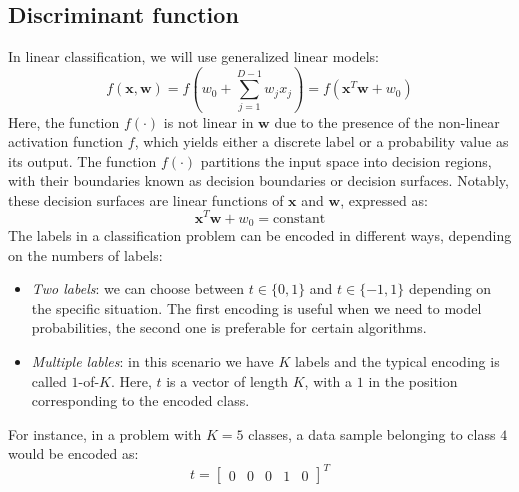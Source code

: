 \subsection{Discriminant function}
In linear classification, we will use generalized linear models: 
\[f(\textbf{x},\textbf{w})=f\left( w_0+\sum_{j=1}^{D-1}w_j x_j \right)=f(\textbf{x}^T\textbf{w}+w_0)\]
Here, the function $f(\cdot)$ is not linear in $\textbf{w}$ due to the presence of the non-linear activation function $f$, which yields either a discrete label or a probability value as its output.
The function $f(\cdot)$ partitions the input space into decision regions, with their boundaries known as decision boundaries or decision surfaces.
Notably, these decision surfaces are linear functions of $\textbf{x}$ and $\textbf{w}$, expressed as:
\[\textbf{x}^T\textbf{w}+w_0=\text{constant}\]
The labels in a classification problem can be encoded in different ways, depending on the numbers of labels: 
\begin{itemize}
    \item \textit{Two labels}: we can choose between $t \in \{0,1\}$ and $t \in \{-1,1\}$ depending on the specific situation. 
        The first encoding is useful when we need to model probabilities, the second one is preferable for certain algorithms. 
    \item \textit{Multiple lables}: in this scenario we have $K$ labels and the typical encoding is called $1$-of-$K$. 
        Here, $t$ is a vector of length $K$, with a $1$  in the position corresponding to the encoded class.
\end{itemize}
\begin{example}
    For instance, in a problem with $K=5$ classes, a data sample belonging to class $4$ would be encoded as:
    \[t=\begin{bmatrix} 0 & 0 & 0 & 1 & 0 \end{bmatrix}^T\] 
\end{example}


